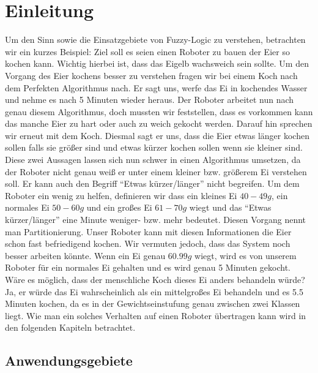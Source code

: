 \documentclass[12pt,a4paper,bibliography=totocnumbered,listof=totocnumbered]{scrartcl}
\theoremstyle{Umgebung}
\begin{document}
\section{Einleitung}

Um den Sinn sowie die Einsatzgebiete von Fuzzy-Logic zu verstehen, betrachten wir ein kurzes Beispiel: Ziel soll es seien einen Roboter zu bauen der Eier so kochen kann. Wichtig hierbei ist, dass das Eigelb wachsweich sein sollte. Um den Vorgang des Eier kochens besser zu verstehen fragen wir bei einem Koch nach dem Perfekten Algorithmus nach. Er sagt uns, werfe das Ei in kochendes Wasser und nehme es nach 5 Minuten wieder heraus. Der Roboter arbeitet nun nach genau diesem Algorithmus, doch mussten wir feststellen, dass es vorkommen kann das manche Eier zu hart oder auch zu weich gekocht werden. Darauf hin sprechen wir erneut mit dem Koch. Diesmal sagt er uns, dass die Eier etwas länger kochen sollen falls sie größer sind und etwas kürzer kochen sollen wenn sie kleiner sind. Diese zwei Aussagen lassen sich nun schwer in einen Algorithmus umsetzen, da der Roboter nicht genau weiß er unter einem kleiner bzw. größerem Ei verstehen soll. Er kann auch den Begriff \enquote{Etwas kürzer/länger} nicht begreifen. Um dem Roboter ein wenig zu helfen, definieren wir dass ein kleines Ei $40-49g$, ein normales Ei $50-60g$ und ein großes Ei $61-70g$ wiegt und das \enquote{Etwas kürzer/länger} eine Minute weniger- bzw. mehr bedeutet. Diesen Vorgang nennt man Partitionierung. Unser Roboter kann mit diesen Informationen die Eier schon fast befriedigend kochen. Wir vermuten jedoch, dass das System noch besser arbeiten könnte. Wenn ein Ei genau $60.99g$ wiegt, wird es von unserem Roboter für ein normales Ei gehalten und es wird genau 5 Minuten gekocht. Wäre es möglich, dass der menschliche Koch dieses Ei anders behandeln würde? Ja, er würde das Ei wahrscheinlich als ein mittelgroßes Ei behandeln und es 5.5 Minuten kochen, da es in der Gewichtseinstufung genau zwischen zwei Klassen liegt. Wie man ein solches Verhalten auf einen Roboter übertragen kann wird in den folgenden Kapiteln betrachtet.

\subsection{Anwendungsgebiete}
\end{document}
